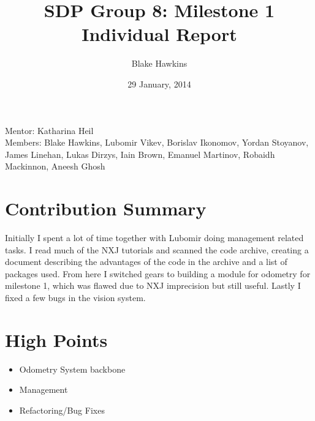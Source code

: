 \documentclass[a4paper,12pt]{article}
\title{SDP Group 8: Milestone 1 Individual Report} %
\author{Blake Hawkins} %
\date{29 January, 2014} %
\begin{document}
\maketitle %

\begin{center}
Mentor: Katharina Heil %
\\
Members: Blake Hawkins, %
Lubomir Vikev,
Borislav Ikonomov,
Yordan Stoyanov,
James Linehan,
Lukas Dirzys,
Iain Brown,
Emanuel Martinov,
Robaidh Mackinnon,
Aneesh Ghosh

\end{center}


\section{Contribution Summary}

Initially I spent a lot of time together with Lubomir doing management related tasks. I read much of the NXJ tutorials and scanned the code archive, creating a document describing the advantages of the code in the archive and a list of packages used. From here I switched gears to building a module for odometry for milestone 1, which was flawed due to NXJ imprecision but still useful. Lastly I fixed a few bugs in the vision system.
 

\section{High Points}

\begin{itemize}
\item Odometry System backbone
\item Management
\item Refactoring/Bug Fixes
\end{itemize}

\end{document}
